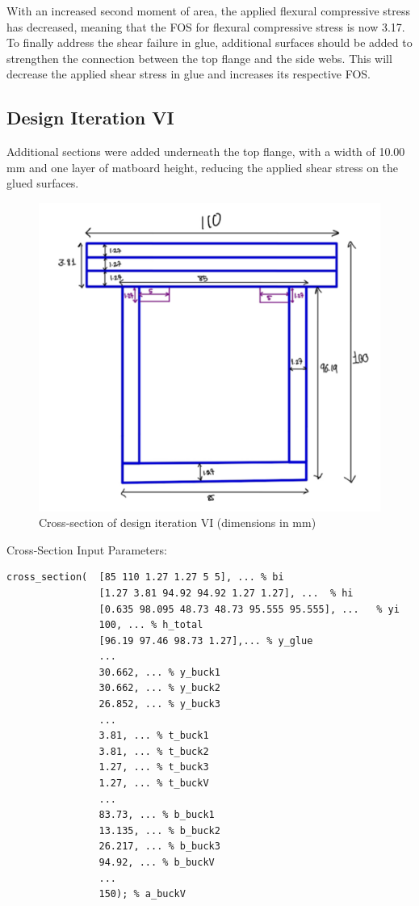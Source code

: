 \documentclass[11pt]{article}
\newcommand{\imagewidth}{.5\linewidth}
\begin{document}
With an increased second moment of area, the applied flexural compressive stress has decreased, meaning that the FOS for flexural compressive stress is now 3.17. To finally address the shear failure in glue, additional surfaces should be added to strengthen the connection between the top flange and the side webs. This will decrease the applied shear stress in glue and increases its respective FOS.

\subsection{Design Iteration VI}

Additional sections were added underneath the top flange, with a width of 10.00 mm and one layer of matboard height, reducing the applied shear stress on the glued surfaces.

\clearpage
\begin{figure}[h]
    \centering
    \includegraphics[width=\imagewidth]{img/design-6-cs.png}
    \caption{Cross-section of design iteration VI (dimensions in mm)}
    \label{d6}
\end{figure}

Cross-Section Input Parameters:
\begin{lstlisting}[]
cross_section(  [85 110 1.27 1.27 5 5], ...	% bi
                [1.27 3.81 94.92 94.92 1.27 1.27], ...	% hi
                [0.635 98.095 48.73 48.73 95.555 95.555], ...	% yi
                100, ... % h_total
                [96.19 97.46 98.73 1.27],... % y_glue
                ...
                30.662, ... % y_buck1
                30.662, ... % y_buck2
                26.852, ... % y_buck3
                ...
                3.81, ... % t_buck1
                3.81, ... % t_buck2
                1.27, ... % t_buck3
                1.27, ... % t_buckV
                ...
                83.73, ... % b_buck1
                13.135, ... % b_buck2
                26.217, ... % b_buck3
                94.92, ... % b_buckV
                ...
                150); % a_buckV
\end{lstlisting}
\end{document}

